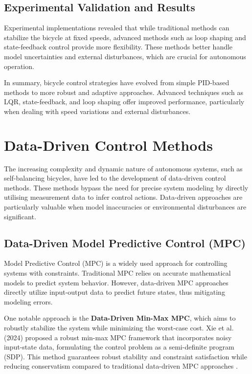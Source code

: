 	\subsection{Experimental Validation and Results}
	Experimental implementations revealed that while traditional methods can stabilize the bicycle at fixed speeds, advanced methods such as loop shaping and state-feedback control provide more flexibility. These methods better handle model uncertainties and external disturbances, which are crucial for autonomous operation.
	
	In summary, bicycle control strategies have evolved from simple PID-based methods to more robust and adaptive approaches. Advanced techniques such as LQR, state-feedback, and loop shaping offer improved performance, particularly when dealing with speed variations and external disturbances.

\section{Data-Driven Control Methods}

	The increasing complexity and dynamic nature of autonomous systems, such as self-balancing bicycles, have led to the development of data-driven control methods. These methods bypass the need for precise system modeling by directly utilising measurement data to infer control actions. Data-driven approaches are particularly valuable when model inaccuracies or environmental disturbances are significant.
	
	\subsection{Data-Driven Model Predictive Control (MPC)}
	Model Predictive Control (MPC) is a widely used approach for controlling systems with constraints. Traditional MPC relies on accurate mathematical models to predict system behavior. However, data-driven MPC approaches directly utilize input-output data to predict future states, thus mitigating modeling errors.
	
	One notable approach is the \textbf{Data-Driven Min-Max MPC}, which aims to robustly stabilize the system while minimizing the worst-case cost. Xie et al. (2024) proposed a robust min-max MPC framework that incorporates noisy input-state data, formulating the control problem as a semi-definite program (SDP). This method guarantees robust stability and constraint satisfaction while reducing conservatism compared to traditional data-driven MPC approaches \cite{xie2024}.
	
